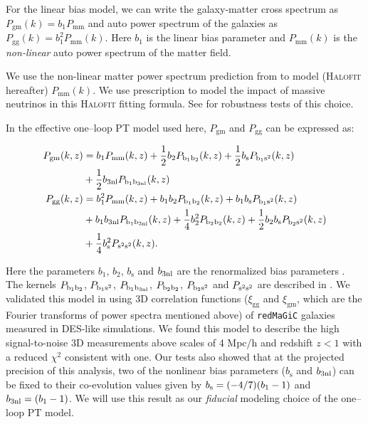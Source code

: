 \documentclass[fleqn,usenatbib]{mnras}
\newcommand{\xigg}{\ensuremath{\xi_{\mathrm{gg}}} }
\newcommand{\xigm}{\ensuremath{\xi_{\mathrm{gm}}} }
\newcommand{\redmagic}{\texttt{redMaGiC} }
\newcommand{\red}[1]{\textcolor{red}{#1}}
\begin{document}
For the linear bias model, we can write the galaxy-matter cross spectrum as $P_{\mathrm{gm}}(k) = b_1 P_{\mathrm{mm}}$ and auto power spectrum of the galaxies as $P_{\mathrm{gg}}(k) = b_1^2 P_{\mathrm{mm}}(k)$. Here $b_1$ is the linear bias parameter and $P_{\mathrm{mm}}(k)$ is the \emph{non-linear} auto power spectrum of the matter field. 

We use the non-linear matter power spectrum prediction from \citet{Takahashi:2012em} to model (\textsc{Halofit} hereafter) $P_{\mathrm{mm}}(k)$. We use \citet{Bird_halofit} prescription to model the impact of massive neutrinos in this \textsc{Halofit} fitting formula. See \cite{y3-generalmethods} for robustness tests of this choice.  


In the effective one--loop PT model used here, $P_{\mathrm{gm}}$ and $P_{\mathrm{gg}}$ can be expressed as:
\begin{linenomath*}
\begin{align}\label{eq:P_gg_gm}
    P_{\mathrm{gm}}(k, z) &= b_1 P_{\mathrm{mm}}(k, z) +  \frac{1}{2} b_2 P_{\rm b_1 b_2}(k, z) + \frac{1}{2} b_{\mathrm{s}} P_{\rm b_1 s^2}(k, z) \nonumber  \\
    & + \frac{1}{2} b_{\rm 3nl}P_{\rm b_1 b_{\rm 3nl}}(k, z) \\
    P_{\mathrm{gg}}(k, z) &= b_1^2 P_{\mathrm{mm}}(k, z) + b_1 b_2 P_{\rm b_1 b_2}(k, z) + b_1 b_{\mathrm{s}}P_{\rm b_1 s^2}(k, z) \nonumber \\ 
    & + b_1b_{\rm 3nl} P_{\rm b_1 b_{\rm 3nl} }(k, z) + \frac{1}{4}b_2^2 P_{\rm b_2 b_2}(k, z) + \frac{1}{2} b_2 b_{\mathrm{s}}P_{\rm b_2 s^2}(k, z)  \nonumber \\ 
    & + \frac{1}{4} b^2_{\mathrm{s}} P_{\rm s^2 s^2}(k, z).  
\end{align}
\end{linenomath*}
Here the parameters $ b_1 $, $ b_2 $, $ b_{\mathrm{s}} $ and $ b_{\rm 3nl} $ are the renormalized bias parameters \citep{McDonald2009}. The kernels $P_{\rm b_1 b_2}$, $P_{\rm b_1 s^2}$, $P_{\rm b_1 b_{\rm 3nl}}$, $P_{\rm b_2 b_2}$, $P_{\rm b_2 s^2}$ and $P_{\rm s^2 s^2}$ are described in \cite{Saito2014a}. We validated this model in \cite{p2020perturbation} using 3D correlation functions ($\xigg$ and $\xigm$, which are the Fourier transforms of power spectra mentioned above) of \redmagic galaxies measured in DES-like simulations. We found this model to describe the high signal-to-noise 3D measurements above scales of 4 Mpc/h and redshift $z < 1$ with a reduced $\chi^2$ consistent with one. Our tests also showed that at the projected precision of this analysis, two of the nonlinear bias parameters ($ b_{\mathrm{s}} $ and $ b_{\rm 3nl} $) can be fixed to their co-evolution values given by $b_{\rm s} = (-4/7) (b_1 - 1)$ and $b_{\rm 3nl} = (b_1 - 1)$. We will use this result as our \textit{fiducial} modeling choice of the one--loop PT model. 
\end{document}
